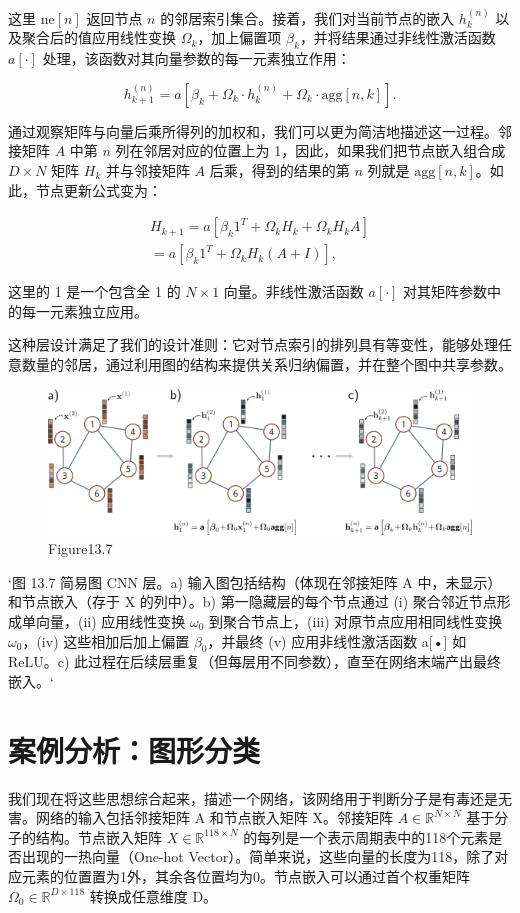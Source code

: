 这里 \(\text{ne}[n]\) 返回节点 \(n\) 的邻居索引集合。接着，我们对当前节点的嵌入 \(h_k^{(n)}\) 以及聚合后的值应用线性变换 \(\Omega_k\)，加上偏置项 \(\beta_k\)，并将结果通过非线性激活函数 \(a[\cdot]\) 处理，该函数对其向量参数的每一元素独立作用：

\[
h_{k+1}^{(n)} = a \left[ \beta_k + \Omega_k \cdot h_k^{(n)} + \Omega_k \cdot \text{agg}[n, k] \right]. \tag{13.9}
\]

通过观察矩阵与向量后乘所得列的加权和，我们可以更为简洁地描述这一过程。邻接矩阵 \(A\) 中第 \(n\) 列在邻居对应的位置上为 1，因此，如果我们把节点嵌入组合成 \(D \times N\) 矩阵 \(H_k\) 并与邻接矩阵 \(A\) 后乘，得到的结果的第 \(n\) 列就是 \(\text{agg}[n, k]\)。如此，节点更新公式变为：


\begin{align}
H_{k+1} = a [\beta_{k} 1^T + \Omega_k H_k + \Omega_k H_k A] \\
= a [\beta_{k} 1^T + \Omega_k H_k (A + I)], \tag{13.10}
\end{align} 


这里的 1 是一个包含全 1 的 \(N \times 1\) 向量。非线性激活函数 \(a[\cdot]\) 对其矩阵参数中的每一元素独立应用。

这种层设计满足了我们的设计准则：它对节点索引的排列具有等变性，能够处理任意数量的邻居，通过利用图的结构来提供关系归纳偏置，并在整个图中共享参数。

\begin{figure}[ht!]
\centering
\includegraphics[width=0.7\linewidth]{png/chapter13/GraphGCN.png}
\caption{Figure13.7}
\end{figure}

`图 13.7 简易图 CNN 层。a) 输入图包括结构（体现在邻接矩阵 A 中，未显示）和节点嵌入（存于 X 的列中）。b) 第一隐藏层的每个节点通过 (i) 聚合邻近节点形成单向量，(ii) 应用线性变换 \(\omega_0\) 到聚合节点上，(iii) 对原节点应用相同线性变换 \(\omega_0\)，(iv) 这些相加后加上偏置 \(\beta_0\)，并最终 (v) 应用非线性激活函数 a[•] 如 ReLU。c) 此过程在后续层重复（但每层用不同参数），直至在网络末端产出最终嵌入。`

\section{案例分析：图形分类}
我们现在将这些思想综合起来，描述一个网络，该网络用于判断分子是有毒还是无害。网络的输入包括邻接矩阵 A 和节点嵌入矩阵 X。邻接矩阵 \(A \in \mathbb{R}^{N \times N}\) 基于分子的结构。节点嵌入矩阵 \(X \in \mathbb{R}^{118 \times N}\) 的每列是一个表示周期表中的118个元素是否出现的一热向量（One-hot Vector）。简单来说，这些向量的长度为118，除了对应元素的位置置为1外，其余各位置均为0。节点嵌入可以通过首个权重矩阵  \(\Omega_0 \in \mathbb{R}^{D \times 118}\) 转换成任意维度 D。


